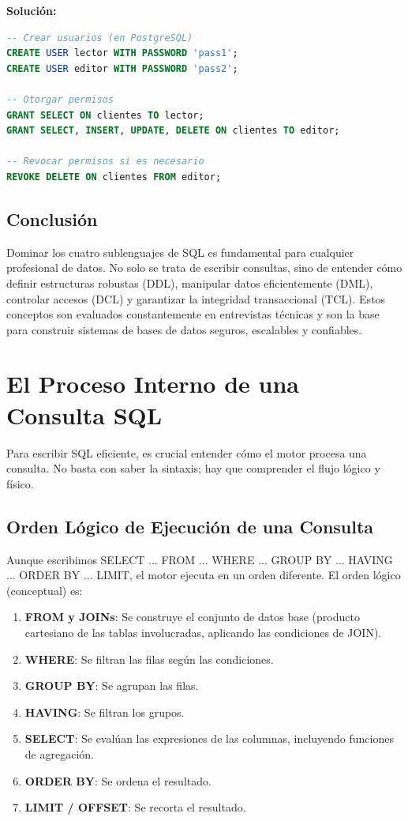 \documentclass[12pt,a4paper,openany,oneside]{book}
\begin{document}
\textbf{Solución:}
\begin{lstlisting}[language=SQL]
-- Crear usuarios (en PostgreSQL)
CREATE USER lector WITH PASSWORD 'pass1';
CREATE USER editor WITH PASSWORD 'pass2';

-- Otorgar permisos
GRANT SELECT ON clientes TO lector;
GRANT SELECT, INSERT, UPDATE, DELETE ON clientes TO editor;

-- Revocar permisos si es necesario
REVOKE DELETE ON clientes FROM editor;
\end{lstlisting}

\section{Conclusión}
Dominar los cuatro sublenguajes de SQL es fundamental para cualquier profesional de datos. No solo se trata de escribir consultas, sino de entender cómo definir estructuras robustas (DDL), manipular datos eficientemente (DML), controlar accesos (DCL) y garantizar la integridad transaccional (TCL). Estos conceptos son evaluados constantemente en entrevistas técnicas y son la base para construir sistemas de bases de datos seguros, escalables y confiables.






\chapter{El Proceso Interno de una Consulta SQL}
Para escribir SQL eficiente, es crucial entender cómo el motor procesa una consulta. No basta con saber la sintaxis; hay que comprender el flujo lógico y físico.

\section{Orden Lógico de Ejecución de una Consulta}
Aunque escribimos SELECT ... FROM ... WHERE ... GROUP BY ... HAVING ... ORDER BY ... LIMIT, el motor ejecuta en un orden diferente. El orden lógico (conceptual) es:

\begin{enumerate}
    \item \textbf{FROM y JOINs}: Se construye el conjunto de datos base (producto cartesiano de las tablas involucradas, aplicando las condiciones de JOIN).
    \item \textbf{WHERE}: Se filtran las filas según las condiciones.
    \item \textbf{GROUP BY}: Se agrupan las filas.
    \item \textbf{HAVING}: Se filtran los grupos.
    \item \textbf{SELECT}: Se evalúan las expresiones de las columnas, incluyendo funciones de agregación.
    \item \textbf{ORDER BY}: Se ordena el resultado.
    \item \textbf{LIMIT / OFFSET}: Se recorta el resultado.
\end{enumerate}
\end{document}

